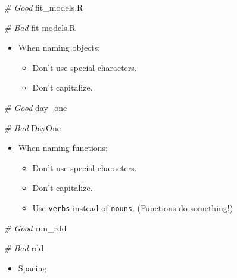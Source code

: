 \documentclass[
]{book}
\newenvironment{Shaded}{\begin{snugshade}}{\end{snugshade}}
\newcommand{\CommentTok}[1]{\textcolor[rgb]{0.56,0.35,0.01}{\textit{#1}}}
\newcommand{\NormalTok}[1]{#1}
\providecommand{\tightlist}{%
  \setlength{\itemsep}{0pt}\setlength{\parskip}{0pt}}
\begin{document}
\begin{Shaded}
\begin{Highlighting}[]
\CommentTok{\# Good}
\NormalTok{fit\_models.R}

\CommentTok{\# Bad}
\NormalTok{fit models.R}
\end{Highlighting}
\end{Shaded}

\begin{itemize}
\tightlist
\item
  When naming objects:

  \begin{itemize}
  \tightlist
  \item
    Don't use special characters.
  \item
    Don't capitalize.
  \end{itemize}
\end{itemize}

\begin{Shaded}
\begin{Highlighting}[]
\CommentTok{\# Good}
\NormalTok{day\_one}

\CommentTok{\# Bad}
\NormalTok{DayOne}
\end{Highlighting}
\end{Shaded}

\begin{itemize}
\tightlist
\item
  When naming functions:

  \begin{itemize}
  \tightlist
  \item
    Don't use special characters.
  \item
    Don't capitalize.
  \item
    Use \texttt{verbs} instead of \texttt{nouns}. (Functions do something!)
  \end{itemize}
\end{itemize}

\begin{Shaded}
\begin{Highlighting}[]
\CommentTok{\# Good}
\NormalTok{run\_rdd}

\CommentTok{\# Bad}
\NormalTok{rdd}
\end{Highlighting}
\end{Shaded}

\begin{itemize}
\tightlist
\item
  Spacing
\end{itemize}
\end{document}
